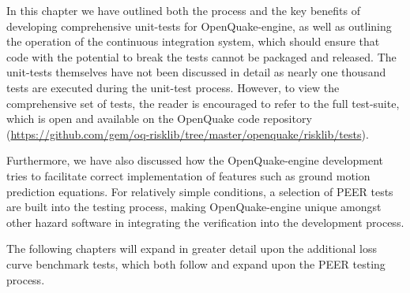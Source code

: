 In this chapter we have outlined both the process and the key benefits of developing comprehensive unit-tests for OpenQuake-engine, as well as outlining the operation of the continuous integration system, which should ensure that code with the potential to break the tests cannot be packaged and released. The unit-tests themselves have not been discussed in detail as nearly one thousand tests are executed during the unit-test process. However, to view the comprehensive set of tests, the reader is encouraged to refer to the full test-suite, which is open and available on the OpenQuake code repository (\href{https://github.com/gem/oq-risklib/tree/master/openquake/risklib/tests}
{https://github.com/gem/oq-risklib/tree/master/openquake/risklib/tests}).

Furthermore, we have also discussed how the OpenQuake-engine development tries to facilitate correct implementation of features such as ground motion prediction equations. For relatively simple conditions, a selection of PEER tests \citep{thomas2010} are built into the testing process, making OpenQuake-engine unique amongst other hazard software in integrating the verification into the development process.

The following chapters will expand in greater detail upon the additional loss curve benchmark tests, which both follow and expand upon the PEER testing process.
